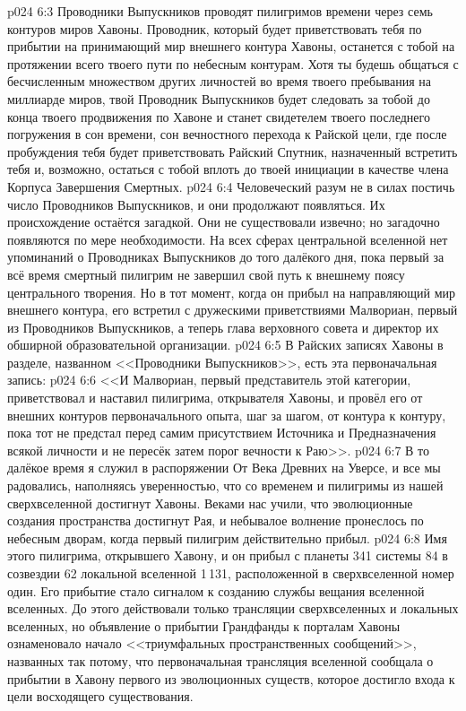 \vs p024 6:3 Проводники Выпускников проводят пилигримов времени через семь контуров миров Хавоны. Проводник, который будет приветствовать тебя по прибытии на принимающий мир внешнего контура Хавоны, останется с тобой на протяжении всего твоего пути по небесным контурам. Хотя ты будешь общаться с бесчисленным множеством других личностей во время твоего пребывания на миллиарде миров, твой Проводник Выпускников будет следовать за тобой до конца твоего продвижения по Хавоне и станет свидетелем твоего последнего погружения в сон времени, сон вечностного перехода к Райской цели, где после пробуждения тебя будет приветствовать Райский Спутник, назначенный встретить тебя и, возможно, остаться с тобой вплоть до твоей инициации в качестве члена Корпуса Завершения Смертных.
\vs p024 6:4 \pc Человеческий разум не в силах постичь число Проводников Выпускников, и они продолжают появляться. Их происхождение остаётся загадкой. Они не существовали извечно; но загадочно появляются по мере необходимости. На всех сферах центральной вселенной нет упоминаний о Проводниках Выпускников до того далёкого дня, пока первый за всё время смертный пилигрим не завершил свой путь к внешнему поясу центрального творения. Но в тот момент, когда он прибыл на направляющий мир внешнего контура, его встретил с дружескими приветствиями Малвориан, первый из Проводников Выпускников, а теперь глава верховного совета и директор их обширной образовательной организации.
\vs p024 6:5 В Райских записях Хавоны в разделе, названном <<Проводники Выпускников>>, есть эта первоначальная запись:
\vs p024 6:6 <<И Малвориан, первый представитель этой категории, приветствовал и наставил пилигрима, открывателя Хавоны, и провёл его от внешних контуров первоначального опыта, шаг за шагом, от контура к контуру, пока тот не предстал перед самим присутствием Источника и Предназначения всякой личности и не пересёк затем порог вечности к Раю>>.
\vs p024 6:7 В то далёкое время я служил в распоряжении От Века Древних на Уверсе, и все мы радовались, наполняясь уверенностью, что со временем и пилигримы из нашей сверхвселенной достигнут Хавоны. Веками нас учили, что эволюционные создания пространства достигнут Рая, и небывалое волнение пронеслось по небесным дворам, когда первый пилигрим действительно прибыл.
\vs p024 6:8 \pc Имя этого пилигрима, открывшего Хавону,  и он прибыл с планеты 341 системы 84 в созвездии 62 локальной вселенной 1\,131, расположенной в сверхвселенной номер один. Его прибытие стало сигналом к созданию службы вещания вселенной вселенных. До этого действовали только трансляции сверхвселенных и локальных вселенных, но объявление о прибытии Грандфанды к порталам Хавоны ознаменовало начало <<триумфальных пространственных сообщений>>, названных так потому, что первоначальная трансляция вселенной сообщала о прибытии в Хавону первого из эволюционных существ, которое достигло входа к цели восходящего существования.
